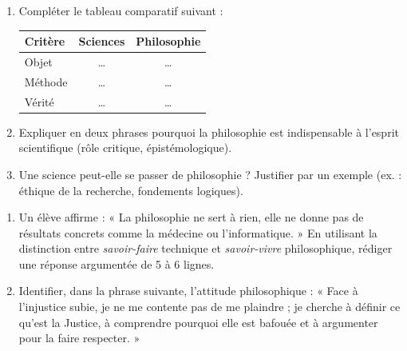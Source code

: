 \documentclass[11pt]{article}
\begin{document}
\begin{exercice}
\begin{enumerate}
    \item Compléter le tableau comparatif suivant :
    \begin{center}
    \begin{tabular}{|l|c|c|}
    \hline
    \textbf{Critère} & \textbf{Sciences} & \textbf{Philosophie} \\ \hline
    Objet & \ldots & \ldots \\ \hline
    Méthode & \ldots & \ldots \\ \hline
    Vérité & \ldots & \ldots \\ \hline
    \end{tabular}
    \end{center}
    \item Expliquer en deux phrases pourquoi la philosophie est indispensable à l'esprit scientifique (rôle critique, épistémologique).
    \item Une science peut-elle se passer de philosophie ? Justifier par un exemple (ex. : éthique de la recherche, fondements logiques).
\end{enumerate}
\end{exercice}

\begin{exercice}
\begin{enumerate}
    \item Un élève affirme : « La philosophie ne sert à rien, elle ne donne pas de résultats concrets comme la médecine ou l'informatique. » En utilisant la distinction entre \textit{savoir-faire} technique et \textit{savoir-vivre} philosophique, rédiger une réponse argumentée de 5 à 6 lignes.
    \item Identifier, dans la phrase suivante, l'attitude philosophique : « Face à l'injustice subie, je ne me contente pas de me plaindre ; je cherche à définir ce qu'est la Justice, à comprendre pourquoi elle est bafouée et à argumenter pour la faire respecter. »
\end{enumerate}
\end{exercice}
\end{document}
